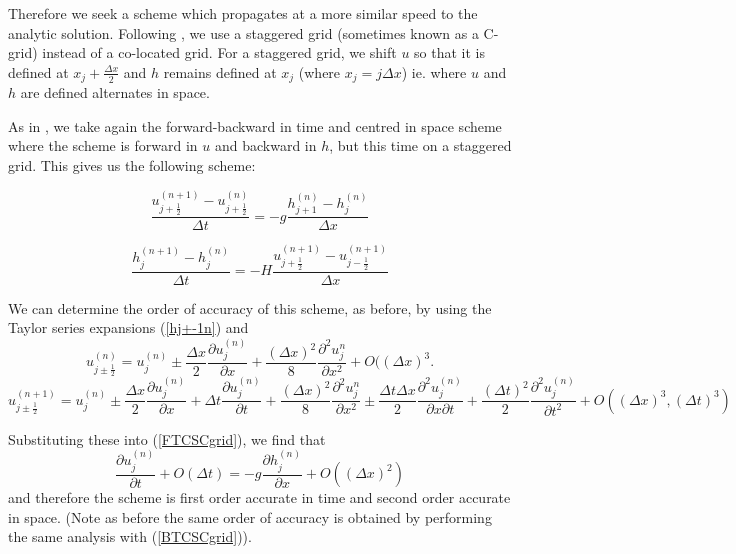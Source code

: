 \documentclass[a4paper,12pt, notitlepage]{report}
\begin{document}
Therefore we seek a scheme which propagates at a more similar speed to the analytic solution. Following \cite{MPE textbook}, we use a staggered grid (sometimes known as a C-grid) instead of a co-located grid. For a staggered grid, we shift $u$ so that it is defined at $x_{j} + \frac{\Delta x}{2}$ and $h$ remains defined at $x_{j}$ (where $x_{j} = j \Delta x$) ie. where $u$ and $h$ are defined alternates in space.

As in \cite{MPE textbook}, we take again the forward-backward in time and centred in space scheme where the scheme is forward in $u$ and backward in $h$, but this time on a staggered grid. This gives us the following scheme:

\begin{equation}\label{FTCSCgrid}
\frac{u_{j+ \frac{1}{2}}^{(n+1)} - u_{j + \frac{1}{2}}^{(n)}}{\Delta t} = -g \frac{h_{j+1}^{(n)} - h_{j}^{(n)}}{\Delta x}
\end{equation}

\begin{equation}\label{BTCSCgrid}
\frac{h_{j}^{(n+1)} - h_{j}^{(n)}}{\Delta t} = -H \frac{u_{j+\frac{1}{2}}^{(n+1)} - u_{j-\frac{1}{2}}^{(n+1)}}{\Delta x}
\end{equation}


We can determine the order of accuracy of this scheme, as before, by using the Taylor series expansions (\ref{hj+-1n}) and 
\begin{equation} \label{uj+1/2n}
u_{j \pm \frac{1}{2}}^{(n)} = u_{j}^{(n)} \pm \frac{\Delta x}{2}\frac{\partial u_{j}^{(n)}}{\partial x} + \frac{(\Delta x)^{2}}{8}\frac{\partial^{2}u_{j}^{n}}{\partial x^{2}} + O({(\Delta x)^{3}}.
\end{equation}
\begin{equation} \label{uj+1/2n+1}
u_{j \pm \frac{1}{2}}^{(n + 1)} = u_{j}^{(n)} \pm \frac{\Delta x}{2}\frac{\partial u_{j}^{(n)}}{\partial x} + \Delta t \frac{\partial u_{j}^{(n)}}{\partial t} + \frac{(\Delta x)^{2}}{8}\frac{\partial^{2}u_{j}^{n}}{\partial x^{2}} \pm \frac{\Delta t \Delta x}{2}\frac{\partial^{2} u_{j}^{(n)}}{\partial x \partial t} + \frac{(\Delta t)^{2}}{2} \frac{\partial ^{2} u_{j}^{(n)}}{\partial t ^{2}} + O((\Delta x)^{3}, (\Delta t)^{3})
\end{equation}

Substituting these into (\ref{FTCSCgrid}), we find that 
\begin{equation}
\frac{\partial u_{j}^{(n)}}{\partial t} + O(\Delta t) =  -g \frac{\partial h_{j}^{(n)}}{\partial x} + O((\Delta x)^{2})
\end{equation} 
and therefore the scheme is first order accurate in time and second order accurate in space. (Note as before the same order of accuracy is obtained by performing the same analysis with (\ref{BTCSCgrid})).
\end{document}
